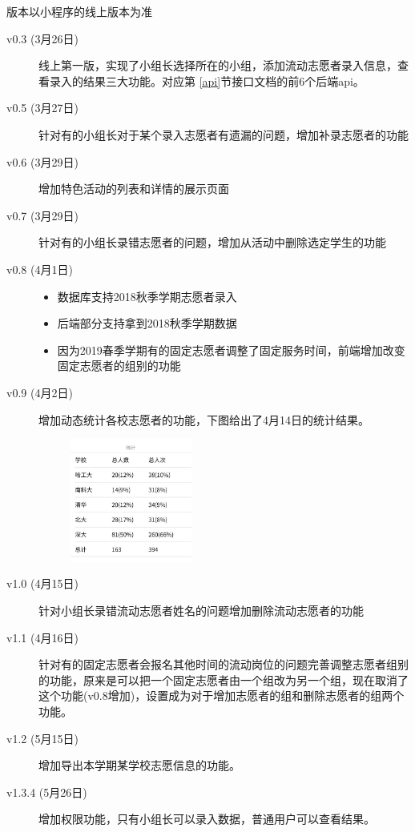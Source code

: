 \documentclass[]{ctexart}
\begin{document}
版本以小程序的线上版本为准
\begin{description}
 \item[v0.3 (3月26日)]

线上第一版，实现了小组长选择所在的小组，添加流动志愿者录入信息，查看录入的结果三大功能。对应第 \ref{api}节接口文档的前6个后端api。

\item[v0.5 (3月27日)]
针对有的小组长对于某个录入志愿者有遗漏的问题，增加补录志愿者的功能

\item[v0.6 (3月29日)]
增加特色活动的列表和详情的展示页面

\item[v0.7 (3月29日)]
针对有的小组长录错志愿者的问题，增加从活动中删除选定学生的功能

\item[v0.8 (4月1日)]
\begin{itemize}
\item
  数据库支持2018秋季学期志愿者录入
\item
  后端部分支持拿到2018秋季学期数据
\item
  因为2019春季学期有的固定志愿者调整了固定服务时间，前端增加改变固定志愿者的组别的功能
\end{itemize}

\item[v0.9 (4月2日)]
增加动态统计各校志愿者的功能，下图给出了4月14日的统计结果。
\begin{figure}[!ht]
\centering
\includegraphics[width=4cm]{volunteer_statistics.jpg}
\end{figure}
\item[v1.0 (4月15日)]
针对小组长录错流动志愿者姓名的问题增加删除流动志愿者的功能

\item[v1.1 (4月16日)]
针对有的固定志愿者会报名其他时间的流动岗位的问题完善调整志愿者组别的功能，原来是可以把一个固定志愿者由一个组改为另一个组，现在取消了这个功能(v0.8增加)，设置成为对于增加志愿者的组和删除志愿者的组两个功能。

\item[v1.2 (5月15日)]
增加导出本学期某学校志愿信息的功能。

\item[v1.3.4 (5月26日)]
增加权限功能，只有小组长可以录入数据，普通用户可以查看结果。
\end{description}
\end{document}
